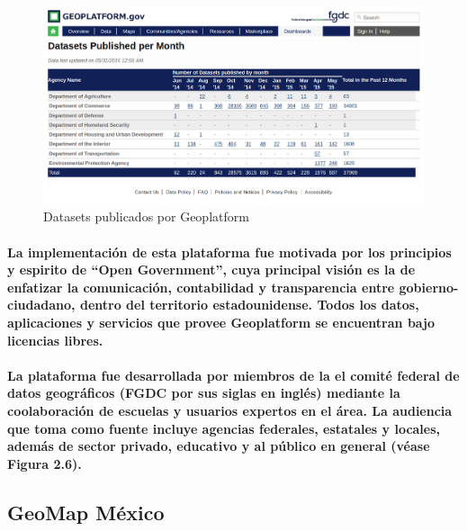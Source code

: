   \begin{figure}[h!]
    \centering
      \includegraphics[width=\textwidth]{./images/GeoPlatform.png}
    \caption{Datasets publicados por Geoplatform}
  \end{figure}    

  \paragraph{La implementación de esta plataforma fue motivada por los principios y espirito de ``Open Government''\cite{21}, cuya principal visión es la de enfatizar la comunicación, contabilidad y transparencia entre gobierno-ciudadano, dentro del territorio estadounidense. Todos los datos, aplicaciones y servicios que provee Geoplatform se encuentran bajo licencias libres.}
  \paragraph{La plataforma fue desarrollada por miembros de la el comité federal de datos geográficos (FGDC por sus siglas en inglés) mediante la coolaboración de escuelas y usuarios expertos en el área. La audiencia que toma como fuente incluye agencias federales, estatales y locales, además de sector privado, educativo y al público en general (véase Figura 2.6). \cite{19}}
  \subsection{GeoMap México}
